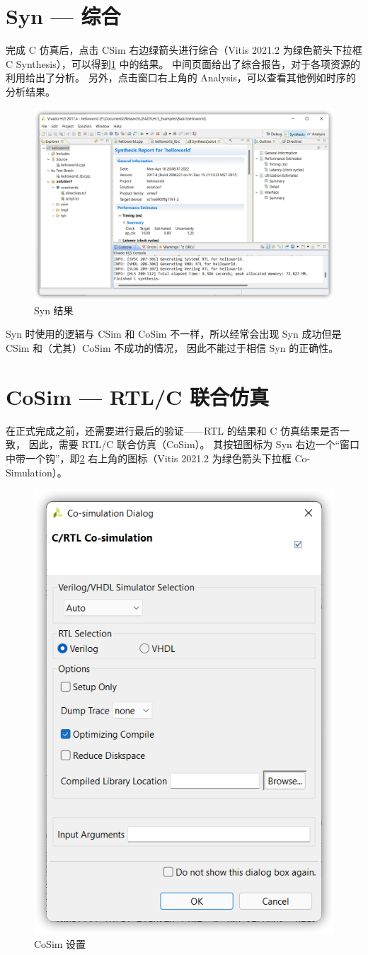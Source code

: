 \documentclass[Chinese,TC,use boldface,simple name]{beaulivre}
\begin{document}
  \section{Syn --- 综合}

    完成 C 仿真后，点击 CSim 右边绿箭头进行综合（Vitis 2021.2 为绿色箭头下拉框 C Synthesis），可以得到\cref{fig:syn_result} 中的结果。
    中间页面给出了综合报告，对于各项资源的利用给出了分析。
    另外，点击窗口右上角的 Analysis，可以查看其他例如时序的分析结果。
    \begin{figure}[htbp]
      \centering
      \includegraphics[width=.8\linewidth]{win/helloworld/syn_result.png}
      \caption{Syn 结果}
      \label{fig:syn_result}
    \end{figure}
    \begin{warning}
      Syn 时使用的逻辑与 CSim 和 CoSim 不一样，所以经常会出现 Syn 成功但是 CSim 和（尤其）CoSim 不成功的情况，
      因此不能过于相信 Syn 的正确性。
    \end{warning}

  \section{CoSim --- RTL/C 联合仿真}

    在正式完成之前，还需要进行最后的验证——RTL 的结果和 C 仿真结果是否一致，
    因此，需要 RTL/C 联合仿真（CoSim）。
    其按钮图标为 Syn 右边一个“窗口中带一个钩”，即\cref{fig:C_RTL_cosim} 右上角的图标（Vitis 2021.2 为绿色箭头下拉框 Co-Simulation）。
    \begin{figure}[htbp]
      \centering
      \includegraphics[width=.3\linewidth]{win/helloworld/C_RTL_cosim.png}
      \caption{CoSim 设置}
      \label{fig:C_RTL_cosim}
    \end{figure}
\end{document}
